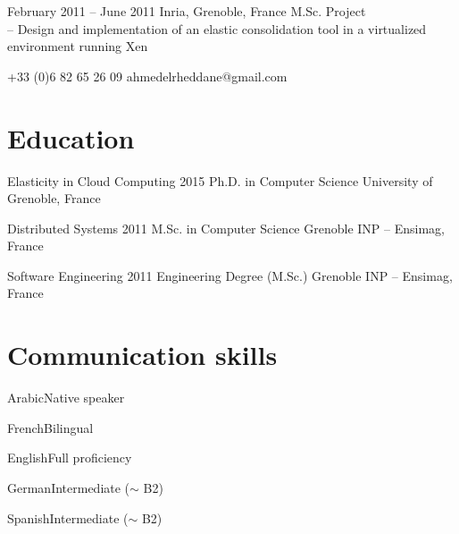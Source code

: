 \documentclass{mytccv}
\begin{document}
\begin{eventlist}
\vspace{\fill}

\item{February 2011 -- June 2011}
     {Inria, Grenoble, France}
     {M.Sc. Project}\\
-- Design and implementation of an elastic consolidation tool in a virtualized environment running Xen

\iffalse
\vspace{\fill}

\item{July 2010 -- September 2010}
     {VMware, Grenoble, France}
     {Software Engineering Internship}\\
-- Composition of customizable virtual machine images for Android Smartphones
\fi
\end{eventlist}

\vspace{-\bigskipamount}

         {+33 (0)6 82 65 26 09}
         {ahmedelrheddane@gmail.com}

\vspace{\fill}

\section{Education}
\begin{yearlist}
\item[Elasticity in Cloud Computing]{2015}
     {Ph.D. in Computer Science}
     {University of Grenoble, France}
\item[Distributed Systems]{2011}
     {M.Sc. in Computer Science}
     {Grenoble INP -- Ensimag, France}
\item[Software Engineering]{2011}
     {Engineering Degree (M.Sc.)}
     {Grenoble INP -- Ensimag, France}
\end{yearlist}

\vspace{\fill}

\section{Communication skills}
\begin{factlist}
\item{Arabic}{Native speaker}
\item{French}{Bilingual}
\item{English}{Full proficiency}
\item{German}{Intermediate ($\sim$ B2)}
\item{Spanish}{Intermediate ($\sim$ B2)}
\end{factlist}
\end{document}
